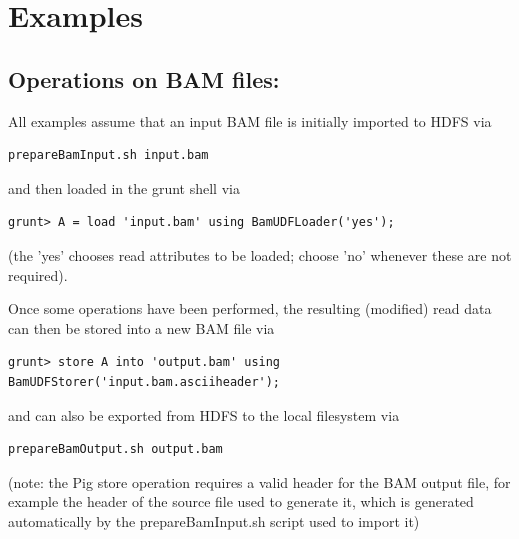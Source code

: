 
\section{Examples}

\subsection{Operations on BAM files:}

All examples assume that an input BAM file is initially imported to HDFS via
\begin{lstlisting} 
prepareBamInput.sh input.bam
\end{lstlisting} 
and then loaded in the grunt shell via
\begin{lstlisting} 
grunt> A = load 'input.bam' using BamUDFLoader('yes');
\end{lstlisting} 
(the 'yes' chooses read attributes to be loaded; choose 'no' whenever these
are not required).

Once some operations have been performed, the resulting (modified) read
data can then be stored into a new BAM file via
\begin{lstlisting}
grunt> store A into 'output.bam' using BamUDFStorer('input.bam.asciiheader');
\end{lstlisting}
and can also be exported from HDFS to the local filesystem via
\begin{lstlisting}
prepareBamOutput.sh output.bam
\end{lstlisting}
(note: the Pig store operation requires a valid header for the BAM output file,
for example the header of the source file used to generate it, which is
generated automatically by the prepareBamInput.sh script used to import it)

